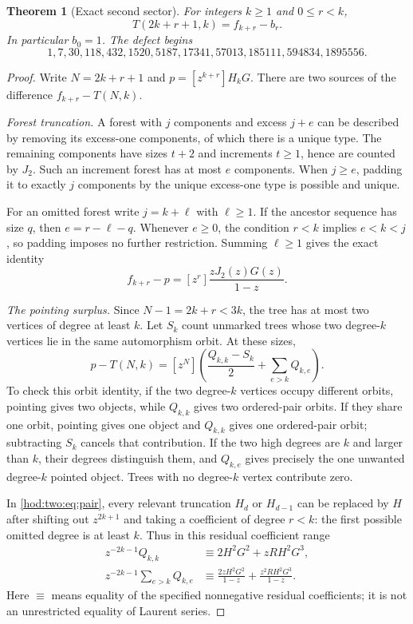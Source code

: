 \documentclass[11pt,letterpaper]{article}
\newtheorem{theorem}{Theorem}[section]
\theoremstyle{definition}\newtheorem{definition}[theorem]{Definition}
\theoremstyle{remark}\newtheorem{remark}[theorem]{Remark}
\begin{document}
\begin{theorem}[Exact second sector]\label{hod:two:thm:twohub}
For integers $k\ge1$ and $0\le r<k$,
\begin{equation}\label{hod:two:eq:twohub}
T(2k+r+1,k)=f_{k+r}-b_r.
\end{equation}
In particular $b_0=1$. The defect begins
\[
1,7,30,118,432,1520,5187,17341,57013,185111,594834,1895556.
\]
\end{theorem}
\begin{proof}
Write $N=2k+r+1$ and $p=[z^{k+r}]H_kG$. There are two sources of the difference $f_{k+r}-T(N,k)$.

\emph{Forest truncation.} A forest with $j$ components and excess $j+e$ can be described by removing its excess-one components, of which there is a unique type. The remaining components have sizes $t+2$ and increments $t\ge1$, hence are counted by $J_2$. Such an increment forest has at most $e$ components. When $j\ge e$, padding it to exactly $j$ components by the unique excess-one type is possible and unique.

For an omitted forest write $j=k+\ell$ with $\ell\ge1$. If the ancestor sequence has size $q$, then $e=r-\ell-q$. Whenever $e\ge0$, the condition $r<k$ implies $e<k<j$, so padding imposes no further restriction. Summing $\ell\ge1$ gives the exact identity
\begin{equation}\label{hod:two:eq:trunc2}
f_{k+r}-p=[z^r]\frac{zJ_2(z)G(z)}{1-z}.
\end{equation}

\emph{The pointing surplus.} Since $N-1=2k+r<3k$, the tree has at most two vertices of degree at least $k$. Let $S_k$ count unmarked trees whose two degree-$k$ vertices lie in the same automorphism orbit. At these sizes,
\begin{equation}\label{hod:two:eq:surplus2}
p-T(N,k)=[z^N]\left(\frac{Q_{k,k}-S_k}{2}+\sum_{e>k}Q_{k,e}\right).
\end{equation}
To check this orbit identity, if the two degree-$k$ vertices occupy different orbits, pointing gives two objects, while $Q_{k,k}$ gives two ordered-pair orbits. If they share one orbit, pointing gives one object and $Q_{k,k}$ gives one ordered-pair orbit; subtracting $S_k$ cancels that contribution. If the two high degrees are $k$ and larger than $k$, their degrees distinguish them, and $Q_{k,e}$ gives precisely the one unwanted degree-$k$ pointed object. Trees with no degree-$k$ vertex contribute zero.

In \eqref{hod:two:eq:pair}, every relevant truncation $H_d$ or $H_{d-1}$ can be replaced by $H$ after shifting out $z^{2k+1}$ and taking a coefficient of degree $r<k$: the first possible omitted degree is at least $k$. Thus in this residual coefficient range
\begin{align}
z^{-2k-1}Q_{k,k}&\equiv2H^2G^2+zRH^2G^3,\\
z^{-2k-1}\sum_{e>k}Q_{k,e}
&\equiv\frac{2zH^2G^2}{1-z}+\frac{z^2RH^2G^3}{1-z}.
\label{hod:two:eq:pairres}
\end{align}
Here $\equiv$ means equality of the specified nonnegative residual coefficients; it is not an unrestricted equality of Laurent series.


\end{proof}
\end{document}
